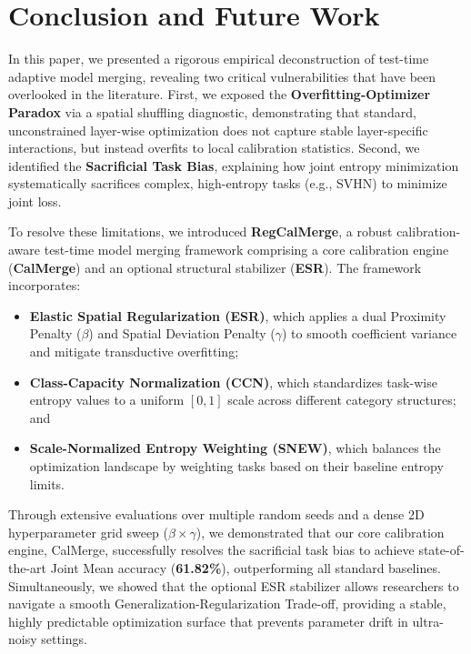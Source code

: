 \section{Conclusion and Future Work}
\label{sec:conclusion}

In this paper, we presented a rigorous empirical deconstruction of test-time adaptive model merging, revealing two critical vulnerabilities that have been overlooked in the literature. First, we exposed the \textbf{Overfitting-Optimizer Paradox} via a spatial shuffling diagnostic, demonstrating that standard, unconstrained layer-wise optimization does not capture stable layer-specific interactions, but instead overfits to local calibration statistics. Second, we identified the \textbf{Sacrificial Task Bias}, explaining how joint entropy minimization systematically sacrifices complex, high-entropy tasks (e.g., SVHN) to minimize joint loss.

To resolve these limitations, we introduced \textbf{RegCalMerge}, a robust calibration-aware test-time model merging framework comprising a core calibration engine (\textbf{CalMerge}) and an optional structural stabilizer (\textbf{ESR}). The framework incorporates:
\begin{itemize}
    \item \textbf{Elastic Spatial Regularization (ESR)}, which applies a dual Proximity Penalty ($\beta$) and Spatial Deviation Penalty ($\gamma$) to smooth coefficient variance and mitigate transductive overfitting;
    \item \textbf{Class-Capacity Normalization (CCN)}, which standardizes task-wise entropy values to a uniform $[0, 1]$ scale across different category structures; and
    \item \textbf{Scale-Normalized Entropy Weighting (SNEW)}, which balances the optimization landscape by weighting tasks based on their baseline entropy limits.
\end{itemize}

Through extensive evaluations over multiple random seeds and a dense 2D hyperparameter grid sweep ($\beta \times \gamma$), we demonstrated that our core calibration engine, CalMerge, successfully resolves the sacrificial task bias to achieve state-of-the-art Joint Mean accuracy (\textbf{61.82\%}), outperforming all standard baselines. Simultaneously, we showed that the optional ESR stabilizer allows researchers to navigate a smooth Generalization-Regularization Trade-off, providing a stable, highly predictable optimization surface that prevents parameter drift in ultra-noisy settings.

